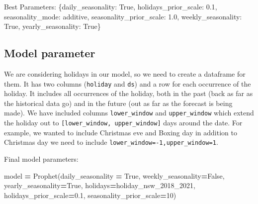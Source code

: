 \documentclass[mstat,12pt]{unswthesis}
\newenvironment{Shaded}{\begin{snugshade}}{\end{snugshade}}
\newcommand{\DecValTok}[1]{\textcolor[rgb]{0.00,0.00,0.81}{#1}}
\newcommand{\FloatTok}[1]{\textcolor[rgb]{0.00,0.00,0.81}{#1}}
\newcommand{\NormalTok}[1]{#1}
\newcommand{\OperatorTok}[1]{\textcolor[rgb]{0.81,0.36,0.00}{\textbf{#1}}}
\newcommand{\StringTok}[1]{\textcolor[rgb]{0.31,0.60,0.02}{#1}}
\newcommand{\VariableTok}[1]{\textcolor[rgb]{0.00,0.00,0.00}{#1}}
\begin{document}
\begin{Shaded}
\begin{Highlighting}[]
\NormalTok{Best Parameters: \{}\StringTok{\textquotesingle{}daily\_seasonality\textquotesingle{}}\NormalTok{: }\VariableTok{True}\NormalTok{, }
                  \StringTok{\textquotesingle{}holidays\_prior\_scale\textquotesingle{}}\NormalTok{: }\FloatTok{0.1}\NormalTok{, }
                  \StringTok{\textquotesingle{}seasonality\_mode\textquotesingle{}}\NormalTok{: }\StringTok{\textquotesingle{}additive\textquotesingle{}}\NormalTok{, }
                  \StringTok{\textquotesingle{}seasonality\_prior\_scale\textquotesingle{}}\NormalTok{: }\FloatTok{1.0}\NormalTok{, }
                  \StringTok{\textquotesingle{}weekly\_seasonality\textquotesingle{}}\NormalTok{: }\VariableTok{True}\NormalTok{, }
                  \StringTok{\textquotesingle{}yearly\_seasonality\textquotesingle{}}\NormalTok{: }\VariableTok{True}\NormalTok{\}}
\end{Highlighting}
\end{Shaded}

\subsection{Model parameter}\label{model-parameter}

We are considering holidays in our model, so we need to create a
dataframe for them. It has two columns (\texttt{holiday} and
\texttt{ds}) and a row for each occurrence of the holiday. It includes
all occurrences of the holiday, both in the past (back as far as the
historical data go) and in the future (out as far as the forecast is
being made). We have included columns \texttt{lower\_window} and
\texttt{upper\_window} which extend the holiday out to
\texttt{{[}lower\_window,\ upper\_window{]}} days around the date. For
example, we wanted to include Christmas eve and Boxing day in addition
to Christmas day we need to include
\texttt{lower\_window=-1,upper\_window=1}.

Final model parameters:

\begin{Shaded}
\begin{Highlighting}[]
\NormalTok{model }\OperatorTok{=}\NormalTok{ Prophet(daily\_seasonality }\OperatorTok{=} \VariableTok{True}\NormalTok{, }
\NormalTok{                weekly\_seasonality}\OperatorTok{=}\VariableTok{False}\NormalTok{, }
\NormalTok{                yearly\_seasonality}\OperatorTok{=}\VariableTok{True}\NormalTok{,   }
\NormalTok{                holidays}\OperatorTok{=}\NormalTok{holiday\_nsw\_2018\_2021, }
\NormalTok{                holidays\_prior\_scale}\OperatorTok{=}\FloatTok{0.1}\NormalTok{, }
\NormalTok{                seasonality\_prior\_scale}\OperatorTok{=}\DecValTok{10}\NormalTok{)}
\end{Highlighting}
\end{Shaded}
\end{document}
